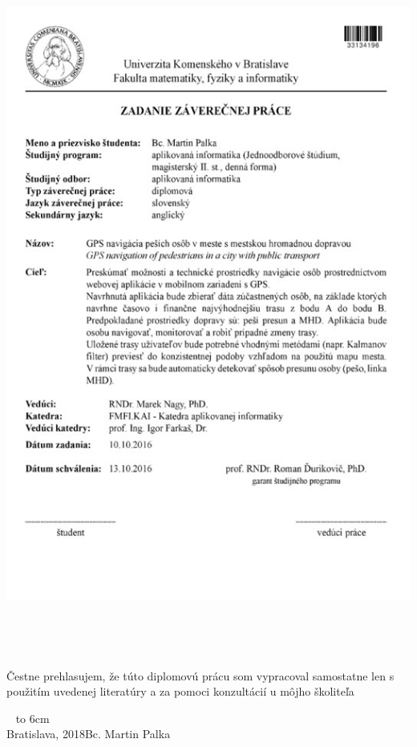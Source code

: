 \documentclass[12pt, a4paper, oneside]{book}
\newcommand\mfauthor{Bc. Martin Palka}
\newcommand\mfplacedate{Bratislava, 2018}
\begin{document}
\thispagestyle{empty}
\includegraphics[width=\textwidth]{images/zadaniedp}
\vfill
\eject

\thispagestyle{empty}


\begin{figure}[H]
\begin{center}
\end{center}
\end{figure}

{~}\vspace{12cm}

\noindent
\begin{minipage}{0.25\textwidth}~\end{minipage}
\begin{minipage}{0.75\textwidth}
Čestne prehlasujem, že túto diplomovú prácu som vypracoval samostatne len
s použitím uvedenej literatúry a za pomoci konzultácií u môjho školiteľa
\newline \newline
\end{minipage}
\vfill
~ \hfill {\hbox to 6cm{\dotfill}} \\
\mfplacedate \hfill \mfauthor
\vfill\eject 
\end{document}
